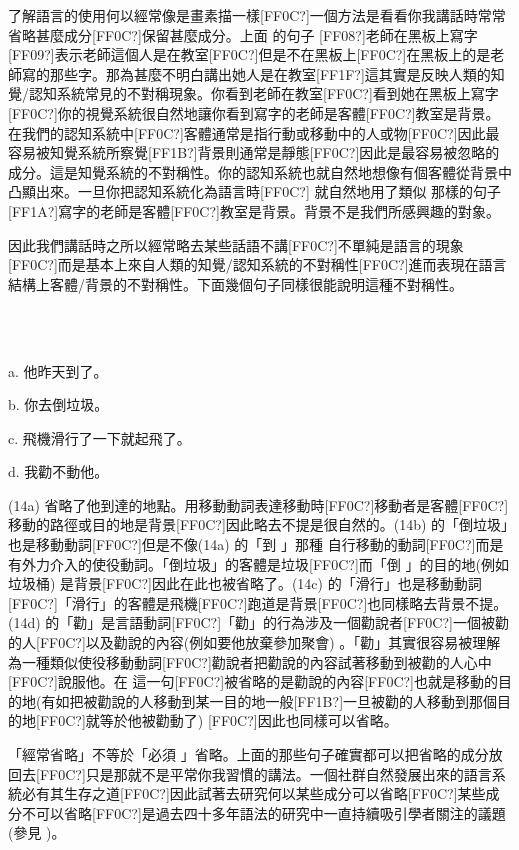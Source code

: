 了解語言的使用何以經常像是畫素描一樣[FF0C?]一個方法是看看你我講話時常常省略甚麼成分[FF0C?]保留甚麼成分。上面  的句子 [FF08?]老師在黑板上寫字[FF09?]表示老師這個人是在教室[FF0C?]但是不在黑板上[FF0C?]在黑板上的是老師寫的那些字。那為甚麼不明白講出她人是在教室[FF1F?]這其實是反映人類的知覺/認知系統常見的不對稱現象。你看到老師在教室[FF0C?]看到她在黑板上寫字[FF0C?]你的視覺系統很自然地讓你看到寫字的老師是客體[FF0C?]教室是背景。在我們的認知系統中[FF0C?]客體通常是指行動或移動中的人或物[FF0C?]因此最容易被知覺系統所察覺[FF1B?]背景則通常是靜態[FF0C?]因此是最容易被忽略的成分。這是知覺系統的不對稱性。你的認知系統也就自然地想像有個客體從背景中凸顯出來。一旦你把認知系統化為語言時[FF0C?] 就自然地用了類似  那樣的句子[FF1A?]寫字的老師是客體[FF0C?]教室是背景。背景不是我們所感興趣的對象。

因此我們講話時之所以經常略去某些話語不講[FF0C?]不單純是語言的現象[FF0C?]而是基本上來自人類的知覺/認知系統的不對稱性[FF0C?]進而表現在語言結構上客體/背景的不對稱性。下面幾個句子同樣很能說明這種不對稱性。

\ea%
\label{ex:key:14}
\gll\\
\\
\glt
\z

a. 他昨天到了。

b. 你去倒垃圾。

c. 飛機滑行了一下就起飛了。

d. 我勸不動他。

(14a) 省略了他到達的地點。用移動動詞表達移動時[FF0C?]移動者是客體[FF0C?]移動的路徑或目的地是背景[FF0C?]因此略去不提是很自然的。(14b) 的「倒垃圾」也是移動動詞[FF0C?]但是不像(14a) 的「到 」那種 自行移動的動詞[FF0C?]而是有外力介入的使役動詞。「倒垃圾」的客體是垃圾[FF0C?]而「倒 」的目的地(例如 垃圾桶) 是背景[FF0C?]因此在此也被省略了。(14c) 的「滑行」也是移動動詞[FF0C?]「滑行」的客體是飛機[FF0C?]跑道是背景[FF0C?]也同樣略去背景不提。(14d) 的「勸」是言語動詞[FF0C?]「勸」的行為涉及一個勸說者[FF0C?]一個被勸的人[FF0C?]以及勸說的內容(例如要他放棄參加聚會) 。「勸」其實很容易被理解為一種類似使役移動動詞[FF0C?]勸說者把勸說的內容試著移動到被勸的人心中[FF0C?]說服他。在 這一句[FF0C?]被省略的是勸說的內容[FF0C?]也就是移動的目的地(有如把被勸說的人移動到某一目的地一般[FF1B?]一旦被勸的人移動到那個目的地[FF0C?]就等於他被勸動了) [FF0C?]因此也同樣可以省略。

「經常省略」不等於「必須 」省略。上面的那些句子確實都可以把省略的成分放回去[FF0C?]只是那就不是平常你我習慣的講法。一個社群自然發展出來的語言系統必有其生存之道[FF0C?]因此試著去研究何以某些成分可以省略[FF0C?]某些成分不可以省略[FF0C?]是過去四十多年語法的研究中一直持續吸引學者關注的議題 (參見 \citealt{David2016})。                 

